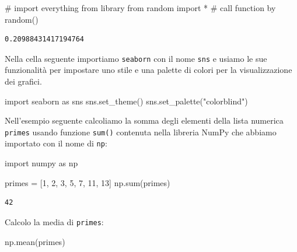 \documentclass[
  letterpaper,
  krantz2]{{[}./krantz{]}}
\newenvironment{Shaded}{\begin{snugshade}}{\end{snugshade}}
\newcommand{\BuiltInTok}[1]{\textcolor[rgb]{0.00,0.23,0.31}{#1}}
\newcommand{\CommentTok}[1]{\textcolor[rgb]{0.37,0.37,0.37}{#1}}
\newcommand{\DecValTok}[1]{\textcolor[rgb]{0.68,0.00,0.00}{#1}}
\newcommand{\ImportTok}[1]{\textcolor[rgb]{0.00,0.46,0.62}{#1}}
\newcommand{\NormalTok}[1]{\textcolor[rgb]{0.00,0.23,0.31}{#1}}
\newcommand{\OperatorTok}[1]{\textcolor[rgb]{0.37,0.37,0.37}{#1}}
\newcommand{\StringTok}[1]{\textcolor[rgb]{0.13,0.47,0.30}{#1}}
\begin{document}
\begin{Shaded}
\begin{Highlighting}[]
\CommentTok{\# import everything from library}
\ImportTok{from}\NormalTok{ random }\ImportTok{import} \OperatorTok{*}
\CommentTok{\# call function by}
\NormalTok{random()}
\end{Highlighting}
\end{Shaded}

\begin{verbatim}
0.20988431417194764
\end{verbatim}

Nella cella seguente importiamo \texttt{seaborn} con il nome
\texttt{sns} e usiamo le sue funzionalità per impostare uno stile e una
palette di colori per la visualizzazione dei grafici.

\begin{Shaded}
\begin{Highlighting}[]
\ImportTok{import}\NormalTok{ seaborn }\ImportTok{as}\NormalTok{ sns}
\NormalTok{sns.set\_theme()}
\NormalTok{sns.set\_palette(}\StringTok{"colorblind"}\NormalTok{)}
\end{Highlighting}
\end{Shaded}

Nell'esempio seguente calcoliamo la somma degli elementi della lista
numerica \texttt{primes} usando funzione \texttt{sum()} contenuta nella
libreria NumPy che abbiamo importato con il nome di \texttt{np}:

\begin{Shaded}
\begin{Highlighting}[]
\ImportTok{import}\NormalTok{ numpy }\ImportTok{as}\NormalTok{ np}

\NormalTok{primes }\OperatorTok{=}\NormalTok{ [}\DecValTok{1}\NormalTok{, }\DecValTok{2}\NormalTok{, }\DecValTok{3}\NormalTok{, }\DecValTok{5}\NormalTok{, }\DecValTok{7}\NormalTok{, }\DecValTok{11}\NormalTok{, }\DecValTok{13}\NormalTok{]}
\NormalTok{np.}\BuiltInTok{sum}\NormalTok{(primes)}
\end{Highlighting}
\end{Shaded}

\begin{verbatim}
42
\end{verbatim}

Calcolo la media di \texttt{primes}:

\begin{Shaded}
\begin{Highlighting}[]
\NormalTok{np.mean(primes)}
\end{Highlighting}
\end{Shaded}
\end{document}

